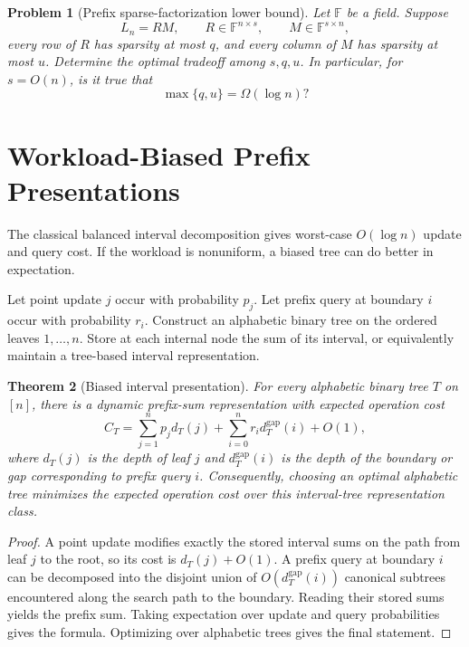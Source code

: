 \documentclass[11pt]{article}
\newtheorem{theorem}{Theorem}[section]
\newtheorem{problem}[theorem]{Problem}
\begin{document}
\begin{problem}[Prefix sparse-factorization lower bound]
Let $\mathbb F$ be a field. Suppose
\[
L_n=RM,
\qquad
R\in\mathbb F^{n\times s},
\qquad
M\in\mathbb F^{s\times n},
\]
every row of $R$ has sparsity at most $q$, and every column of $M$ has sparsity at most $u$. Determine the optimal tradeoff among $s,q,u$. In particular, for $s=O(n)$, is it true that
\[
\max\{q,u\}=\Omega(\log n)?
\]
\end{problem}

\section{Workload-Biased Prefix Presentations}

The classical balanced interval decomposition gives worst-case $O(\log n)$ update and query cost. If the workload is nonuniform, a biased tree can do better in expectation.

Let point update $j$ occur with probability $p_j$. Let prefix query at boundary $i$ occur with probability $r_i$. Construct an alphabetic binary tree on the ordered leaves $1,\ldots,n$. Store at each internal node the sum of its interval, or equivalently maintain a tree-based interval representation.

\begin{theorem}[Biased interval presentation]
For every alphabetic binary tree $T$ on $[n]$, there is a dynamic prefix-sum representation with expected operation cost
\[
C_T
=
\sum_{j=1}^n p_j d_T(j)
+
\sum_{i=0}^{n} r_i d_T^{\mathrm{gap}}(i)
+
O(1),
\]
where $d_T(j)$ is the depth of leaf $j$ and $d_T^{\mathrm{gap}}(i)$ is the depth of the boundary or gap corresponding to prefix query $i$. Consequently, choosing an optimal alphabetic tree minimizes the expected operation cost over this interval-tree representation class.
\end{theorem}

\begin{proof}
A point update modifies exactly the stored interval sums on the path from leaf $j$ to the root, so its cost is $d_T(j)+O(1)$. A prefix query at boundary $i$ can be decomposed into the disjoint union of $O(d_T^{\mathrm{gap}}(i))$ canonical subtrees encountered along the search path to the boundary. Reading their stored sums yields the prefix sum. Taking expectation over update and query probabilities gives the formula. Optimizing over alphabetic trees gives the final statement.
\end{proof}
\end{document}
